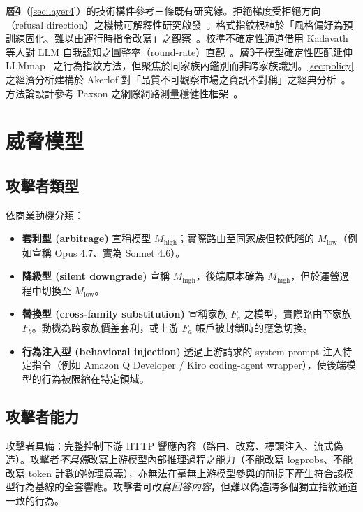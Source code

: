 \documentclass[UTF8,fontset=none,10pt,a4paper,twocolumn]{ctexart}
\begin{document}
層\textcircled{\scriptsize 4}（\cref{sec:layer4}）的技術構件參考三條既有研究線。拒絕梯度受拒絕方向（refusal direction）之機械可解釋性研究啟發~\cite{arditi2024refusal}。格式指紋根植於「風格偏好為預訓練固化、難以由運行時指令改寫」之觀察~\cite{mcgovern2024stylistic}。校準不確定性通道借用 Kadavath 等人對 LLM 自我認知之圓整率（round-rate）直觀~\cite{kadavath2022know}。層\textcircled{\scriptsize 3}子模型確定性匹配延伸 LLMmap~\cite{pasquini2024llmmap} 之行為指紋方法，但聚焦於同家族內鑑別而非跨家族識別。\cref{sec:policy} 之經濟分析建構於 Akerlof 對「品質不可觀察市場之資訊不對稱」之經典分析~\cite{akerlof1970lemons}。方法論設計參考 Paxson 之網際網路測量穩健性框架~\cite{paxson2004sound}。

\section{威脅模型}\label{sec:threat}

\subsection{攻擊者類型}
依商業動機分類：

\begin{itemize}
\item \textbf{套利型 (arbitrage)} 宣稱模型 $M_{\text{high}}$；實際路由至同家族但較低階的 $M_{\text{low}}$（例如宣稱 Opus 4.7、實為 Sonnet 4.6）。
\item \textbf{降級型 (silent downgrade)} 宣稱 $M_{\text{high}}$，後端原本確為 $M_{\text{high}}$，但於運營過程中切換至 $M_{\text{low}}$。
\item \textbf{替換型 (cross-family substitution)} 宣稱家族 $F_a$ 之模型，實際路由至家族 $F_b$。動機為跨家族價差套利，或上游 $F_a$ 帳戶被封鎖時的應急切換。
\item \textbf{行為注入型 (behavioral injection)} 透過上游請求的 system prompt 注入特定指令（例如 Amazon Q Developer / Kiro coding-agent wrapper），使後端模型的行為被限縮在特定領域。
\end{itemize}

\subsection{攻擊者能力}
攻擊者具備：完整控制下游 HTTP 響應內容（路由、改寫、標頭注入、流式偽造）。攻擊者\emph{不具備}改寫上游模型內部推理過程之能力（不能改寫 logprobs、不能改寫 token 計數的物理意義），亦無法在毫無上游模型參與的前提下產生符合該模型行為基線的全套響應。攻擊者可改寫\emph{回答內容}，但難以偽造跨多個獨立指紋通道一致的行為。
\end{document}
